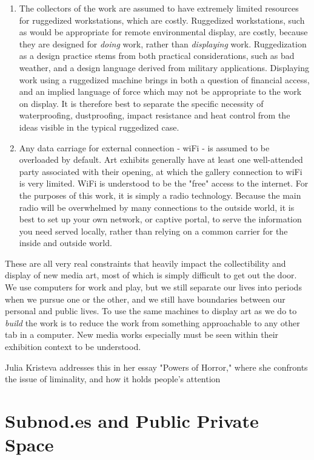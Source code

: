 \begin{enumerate}
  \item The collectors of the work are assumed to have extremely limited resources for ruggedized workstations, which are costly.
  Ruggedized workstations, such as would be appropriate for remote environmental display, are costly, because they are designed for \textit{doing} work, rather than \textit{displaying} work. Ruggedization as a design practice stems from both practical considerations, such as bad weather, and a design language derived from military applications. Displaying work using a ruggedized machine brings in both a question of financial access, and an implied language of force which may not be appropriate to the work on display. It is therefore best to separate the specific necessity of waterproofing, dustproofing, impact resistance and heat control from the ideas visible in the typical ruggedized case.
  \item Any data carriage for external connection - wiFi - is assumed to be overloaded by default.
  Art exhibits generally have at least one well-attended party associated with their opening, at which the gallery connection to wiFi is very limited. WiFi is understood to be the "free" access to the internet. For the purposes of this work, it is simply a radio technology. Because the main radio will be overwhelmed by many connections to the outside world, it is best to set up your own network, or captive portal, to serve the information you need served locally, rather than relying on a common carrier for the inside and outside world.
\end{enumerate}

These are all very real constraints that heavily impact the collectibility and display of new media art, most of which is simply difficult to get out the door. We use computers for work and play, but we still separate our lives into periods when we pursue one or the other, and we still have boundaries between our personal and public lives. To use the same machines to display art as we do to \textit{build} the work is to reduce the work from something approachable to any other tab in a computer. New media works especially must be seen within their exhibition context to be understood.

Julia Kristeva addresses this in her essay "Powers of Horror," where she confronts the issue of liminality, and how it holds people's attention

\section{Subnod.es and Public Private Space}

